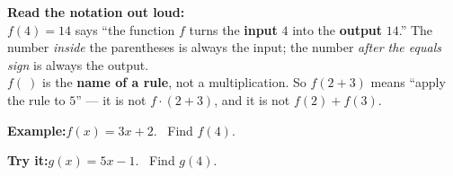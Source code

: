 \documentclass[12pt]{article}
\begin{document}

\begin{formulabox}\textbf{Read the notation out loud:}\\[3pt]
$f(4) = 14$ says ``the function $f$ turns the \textbf{input} $4$ into the
\textbf{output} $14$.'' The number \emph{inside} the parentheses is always the
input; the number \emph{after the equals sign} is always the output.\\[3pt]
$f(\ )$ is the \textbf{name of a rule}, not a multiplication. So
$f(2+3)$ means ``apply the rule to $5$'' --- it is not $f \cdot (2+3)$, and it
is not $f(2) + f(3)$.
\end{formulabox}
\begin{examplebox}\textbf{Example:}\quad $f(x) = 3x + 2$. \ Find $f(4)$.
\end{examplebox}
\begin{tryitbox}\textbf{Try it:}\quad $g(x) = 5x - 1$. \ Find $g(4)$.\\[2pt]
\end{tryitbox}
\end{document}
